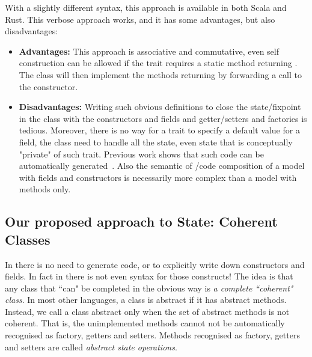 \noindent 
With a slightly different syntax, this approach is available in both Scala and Rust.
This verbose approach works, and it has some advantages, but also disadvantages: 

\begin{itemize}

\item {\bf Advantages:} This approach is associative and commutative, even self construction
  can be allowed if the trait requires a static method
  returning \Q@This@. The class will then implement the methods returning \Q@This@
  by forwarding a call to the constructor.
  
\item {\bf Disadvantages:} Writing such obvious definitions to close
  the state/fixpoint in the class 
   with the constructors and fields and getter/setters and factories is tedious.
   Moreover, there is no way for a trait to specify a default value for a field,
   the class need to handle all the state, even state that is conceptually
   "private" of such trait. 
   Previous work shows that such code can be automatically
   generated~\cite{wang2016classless}.
   Also the semantic of \Q@Use@/code composition of a model with fields and constructors is necessarily
   more complex than a model with methods only.
\end{itemize}

\subsection{Our proposed approach to State: Coherent Classes}

In \name there is no need to generate
code, or to explicitly write down constructors and fields. In fact in
\name there is not even syntax for those constructs!  The idea is that
any class that ``can" be completed in the obvious way  is \emph{a
  complete ``coherent" class}.  In most other languages, a class is
abstract if it has abstract methods.  Instead, we call a class
abstract only when the set of abstract methods is not coherent. That
is, the unimplemented methods cannot not be automatically recognised
as factory, getters and setters. Methods recognised as factory, getters and setters are called
\emph{abstract state operations}.
  
